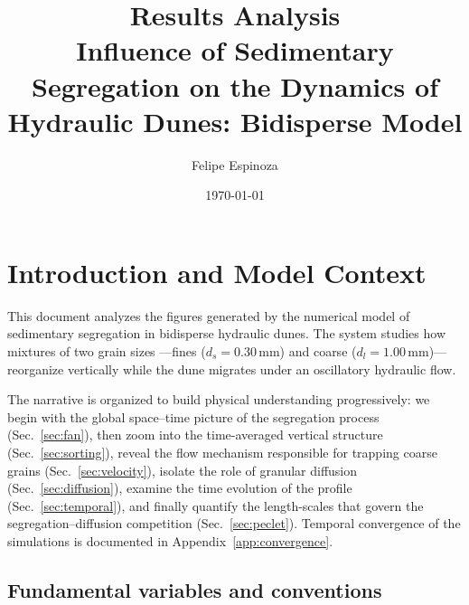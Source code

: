 \documentclass[12pt, a4paper]{article}
\title{%
    \textbf{Results Analysis}\\[0.4em]
    \large Influence of Sedimentary Segregation on the Dynamics
    of Hydraulic Dunes: Bidisperse Model}
\author{Felipe Espinoza}
\date{\today}
\begin{document}
\maketitle
\tableofcontents
\newpage

\section{Introduction and Model Context}

This document analyzes the figures generated by the numerical model of
sedimentary segregation in bidisperse hydraulic dunes. The system
studies how mixtures of two grain sizes ---fines ($d_s = 0.30$\,mm)
and coarse ($d_l = 1.00$\,mm)--- reorganize vertically while the
dune migrates under an oscillatory hydraulic flow.

The narrative is organized to build physical understanding progressively:
we begin with the global space--time picture of the segregation process
(Sec.~\ref{sec:fan}), then zoom into the time-averaged vertical structure
(Sec.~\ref{sec:sorting}), reveal the flow mechanism responsible for
trapping coarse grains (Sec.~\ref{sec:velocity}), isolate the role of
granular diffusion (Sec.~\ref{sec:diffusion}), examine the time evolution
of the profile (Sec.~\ref{sec:temporal}), and finally quantify the
length-scales that govern the segregation--diffusion competition
(Sec.~\ref{sec:peclet}).
Temporal convergence of the simulations is documented in
Appendix~\ref{app:convergence}.

\subsection*{Fundamental variables and conventions}
\end{document}
